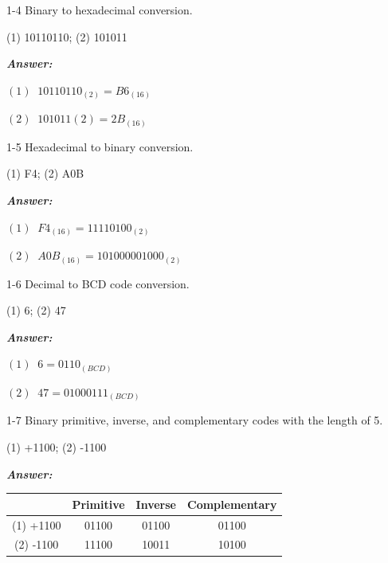 \documentclass[12pt]{article}
\newenvironment{Answer}{
  \vspace{12pt}
  {\large\textbf{\textit{\hspace{-12pt}Answer:}}}\par
  \vspace{8pt}
} {\vspace{24pt}}
\begin{document}
\begin{question}{}{}
  1-4 Binary to hexadecimal conversion.

  (1) 10110110; (2) 101011
\end{question}
\begin{Answer}
\noindent
\begin{minipage}{0.5\textwidth}
$(1)\;\;10110110_{(2)} = B6_{(16)}$
\end{minipage}\begin{minipage}{0.5\textwidth}
$(2)\;\;101011(2) = 2B_{(16)}$
\end{minipage}
\end{Answer}

\begin{question}{}{}
  1-5 Hexadecimal to binary conversion.

  (1) F4; (2) A0B
\end{question}
\begin{Answer}
\noindent
\begin{minipage}{0.5\textwidth}
$(1)\;\;F4_{(16)} = 11110100_{(2)}$
\end{minipage}\begin{minipage}{0.5\textwidth}
$(2)\;\;A0B_{(16)} = 101000001000_{(2)}$
\end{minipage}
\end{Answer}

\begin{question}{}{}
  1-6 Decimal to BCD code conversion.

  (1) 6; (2) 47
\end{question}
\begin{Answer}
\noindent
\begin{minipage}{0.5\textwidth}
$(1)\;\;6 = 0110_{(BCD)}$
\end{minipage}\begin{minipage}{0.5\textwidth}
$(2)\;\;47 = 01000111_{(BCD)}$
\end{minipage}
\end{Answer}

\begin{question}{}{}
  1-7 Binary primitive, inverse, and complementary codes with the length of 5.

  (1) +1100; (2) -1100
\end{question}
\begin{Answer}
\begin{table}[h]
\centering
\begin{tabular}{|c|c|c|c|}
\hline
& Primitive & Inverse & Complementary \\ \hline
(1) +1100 & 01100 & 01100 & 01100 \\ \hline
(2) -1100 & 11100 & 10011 & 10100 \\ \hline
\end{tabular}
\end{table}
\end{Answer}
\end{document}
